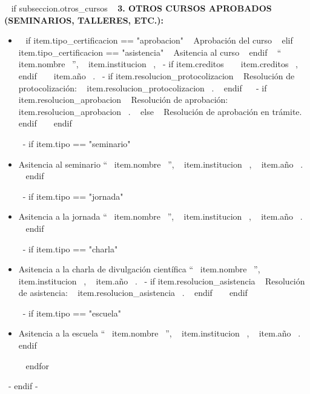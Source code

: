     ~{ if subseccion.otros_cursos }~
      \textbf{3. OTROS CURSOS APROBADOS (SEMINARIOS, TALLERES, ETC.):}
      \begin{itemize}
      ~{ for item in subseccion.otros_cursos }~
        ~{- if item.tipo == "curso" }~
          \item ~{ if item.tipo_certificacion == "aprobacion" }~ Aprobación del curso ~{ elif item.tipo_certificacion == "asistencia" }~ Asitencia al curso ~{ endif }~
                ``~{{ item.nombre }}~'', ~{{ item.institucion }}~,
                ~{- if item.creditos }~ ~{{ item.creditos }}~, ~{ endif }~
                ~{{ item.año }}~.
                ~{- if item.resolucion_protocolizacion }~ Resolución de protocolización: ~{{ item.resolucion_protocolizacion }}~. ~{ endif }~
                ~{- if item.resolucion_aprobacion }~ Resolución de aprobación: ~{{ item.resolucion_aprobacion }}~. ~{ else }~ Resolución de aprobación en trámite. ~{ endif }~
          \vspace{1mm}
        ~{ endif }~

        ~{- if item.tipo == "seminario" }~
          \item Asitencia al seminario ``~{{ item.nombre }}~'', ~{{ item.institucion }}~, ~{{ item.año }}~.
          \vspace{1mm}
        ~{ endif }~

        ~{- if item.tipo == "jornada" }~
          \item Asitencia a la jornada ``~{{ item.nombre }}~'', ~{{ item.institucion }}~, ~{{ item.año }}~.
          \vspace{1mm}
        ~{ endif }~

        ~{- if item.tipo == "charla" }~
          \item Asitencia a la charla de divulgación científica ``~{{ item.nombre }}~'', ~{{ item.institucion }}~, ~{{ item.año }}~.
                ~{- if item.resolucion_asistencia }~ Resolución de asistencia: ~{{ item.resolucion_asistencia }}~. ~{ endif }~
          \vspace{1mm}
        ~{ endif }~

        ~{- if item.tipo == "escuela" }~
          \item Asitencia a la escuela ``~{{ item.nombre }}~'', ~{{ item.institucion }}~, ~{{ item.año }}~.
          \vspace{1mm}
        ~{ endif }~

      ~{ endfor }~
      \end{itemize}
      \vspace{1mm}
    ~{- endif -}~

